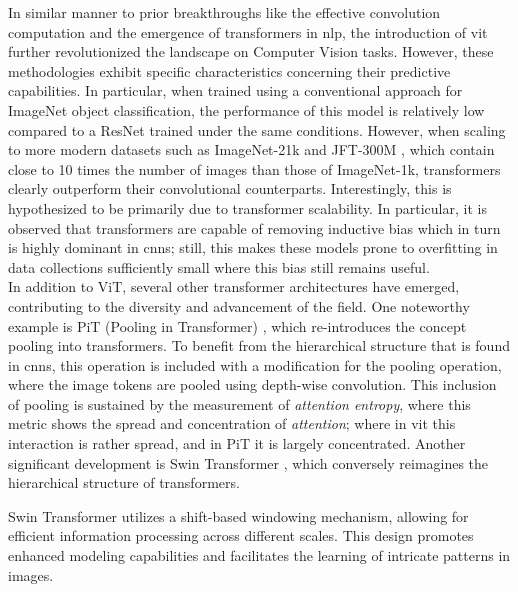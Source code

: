 
\noindent In similar manner to prior breakthroughs like the effective convolution computation and the 
emergence of transformers in \gls{nlp}, the introduction of \gls{vit} further revolutionized the 
landscape on Computer Vision tasks. However, these methodologies exhibit specific characteristics 
concerning their predictive capabilities. In particular, when trained using a conventional 
approach for ImageNet object classification, the performance of this model is relatively low 
compared to a ResNet trained under the same conditions. However, when scaling to more modern 
datasets such as ImageNet-21k and JFT-300M \autocite{sun2017revisiting}, which contain close to 10 
times the number of images than those of ImageNet-1k, transformers clearly outperform their 
convolutional counterparts. Interestingly, this is hypothesized to be primarily due to transformer 
scalability. In particular, it is observed that transformers are capable of removing inductive bias 
which in turn is highly dominant in \glspl{cnn}; still, this makes these models prone to overfitting 
in data collections sufficiently small where this bias still remains useful.\\
\noindent In addition to ViT, several other transformer architectures have emerged, contributing to 
the diversity and advancement of the field. One noteworthy example is PiT (Pooling in Transformer) 
\autocite{heo2021rethinking}, which re-introduces the concept pooling into transformers. To benefit 
from the hierarchical structure that is found in \glspl{cnn}, this operation is included with 
a modification for the pooling operation, where the image tokens are  pooled using depth-wise 
convolution. This inclusion of pooling is sustained by the measurement of \emph{attention entropy}, 
where this metric shows the spread and concentration of \emph{attention}; where in \gls{vit} this 
interaction is rather spread, and in PiT it is largely concentrated. Another significant 
development is Swin Transformer \autocite{liu2021swin}, which conversely reimagines the 
hierarchical structure of transformers. 

Swin Transformer utilizes a shift-based windowing mechanism, allowing for efficient information 
processing across different scales. This design promotes enhanced modeling capabilities and 
facilitates the learning of intricate patterns in images.\\

